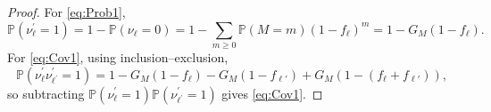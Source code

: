 \documentclass[10pt,a4paper]{amsart}
\newcommand{\PP}{\mathbb{P}}
\begin{document}
\begin{proof}
For \eqref{eq:Prob1},
\begin{equation*}
\PP(\nu^{\prime}_\ell = 1)=1-\PP(\nu_\ell=0)=1-\sum_{m\ge 0}\PP(M=m)(1-f_\ell)^m=1-G_M(1-f_\ell).
\end{equation*}
For \eqref{eq:Cov1}, using inclusion--exclusion,
\begin{equation*}
\PP(\nu^{\prime}_\ell \nu^{\prime}_{\ell^\prime}=1)=1-G_M(1-f_\ell)-G_M(1-f_{\ell'})+G_M(1-(f_\ell+f_{\ell'})),
\end{equation*}
so subtracting $\PP(\nu^{\prime}_\ell = 1)\PP(\nu^{\prime}_{\ell^\prime} = 1)$ gives \eqref{eq:Cov1}.
\end{proof}
\end{document}
